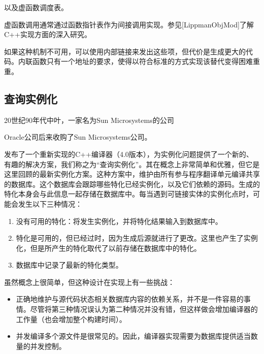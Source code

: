 以及虚函数调度表。

\begin{notice}
虚函数调用通常通过函数指针表作为间接调用实现。参见[LippmanObjMod]了解C++实现方面的深入研究。
\end{notice}

如果这种机制不可用，可以使用内部链接来发出这些项，但代价是生成更大的代码。内联函数只有一个地址的要求，使得以符合标准的方式实现该替代变得困难重重。

\subsection{查询实例化}

20世纪90年代中叶，一家名为Sun Microsystems的公司

\begin{notice}
Oracle公司后来收购了Sun Microsystems公司。
\end{notice}

发布了一个重新实现的C++编译器（4.0版本），为实例化问题提供了一个新的、有趣的解决方案，我们称之为“查询实例化”。其在概念上非常简单和优雅，但它是这里回顾的最新实例化方案。这种方案中，维护由所有参与程序翻译单元编译共享的数据库。这个数据库会跟踪哪些特化已经实例化，以及它们依赖的源码。生成的特化本身会与此信息一起存储在数据库中。每当遇到可链接实体的实例化点时，可能会发生以下三种情况：

\begin{enumerate}
\item 
没有可用的特化：将发生实例化，并将特化结果输入到数据库中。

\item 
特化是可用的，但已经过时，因为生成后源就进行了更改。这里也产生了实例化，但是所产生的特化取代了以前存储在数据库中的特化。

\item 
数据库中记录了最新的特化类型。
\end{enumerate}

虽然概念上很简单，但这种设计在实现上有一些挑战：

\begin{itemize}
\item 
正确地维护与源代码状态相关数据库内容的依赖关系，并不是一件容易的事情。尽管将第三种情况误认为第二种情况并没有错，但这样做会增加编译器的工作量（也会增加整个构建时间）。

\item 
并发编译多个源文件是很常见的。因此，编译器实现需要为数据库提供适当数量的并发控制。
\end{itemize}

